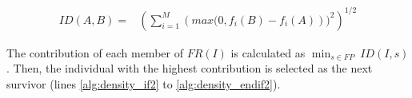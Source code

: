 \begin{equation} \label{eq:ImprovementDistance}
\begin{split}
 ID(A, B) = &  \left (\sum_{i=1}^M \left (max(0, f_i(B) - f_i(A) \right ))^2  \right)^{1/2}
\end{split}
\end{equation}

The contribution of each member of $FR (I)$ is calculated as $\displaystyle{\min_{s \in FP}\ ID(I, s)}$.
%
Then, the individual with the highest contribution is selected as the next survivor (lines \ref{alg:density_if2} 
to \ref{alg:density_endif2}).


